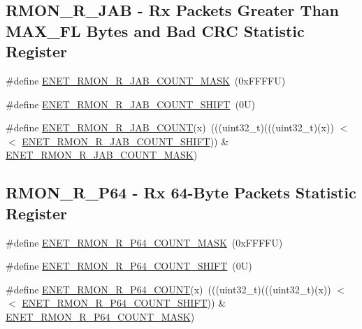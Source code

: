 \subsection*{R\+M\+O\+N\+\_\+\+R\+\_\+\+J\+AB -\/ Rx Packets Greater Than M\+A\+X\+\_\+\+FL Bytes and Bad C\+RC Statistic Register}
\begin{DoxyCompactItemize}
\item 
\#define \mbox{\hyperlink{group___e_n_e_t___register___masks_ga838c0d34688a6347e786a3a66de2fc66}{E\+N\+E\+T\+\_\+\+R\+M\+O\+N\+\_\+\+R\+\_\+\+J\+A\+B\+\_\+\+C\+O\+U\+N\+T\+\_\+\+M\+A\+SK}}~(0x\+F\+F\+F\+F\+U)
\item 
\#define \mbox{\hyperlink{group___e_n_e_t___register___masks_gaec7a433149507aefe611734ae19e7878}{E\+N\+E\+T\+\_\+\+R\+M\+O\+N\+\_\+\+R\+\_\+\+J\+A\+B\+\_\+\+C\+O\+U\+N\+T\+\_\+\+S\+H\+I\+FT}}~(0\+U)
\item 
\#define \mbox{\hyperlink{group___e_n_e_t___register___masks_gaf4a53632e9204c3fa6b812bb2c924976}{E\+N\+E\+T\+\_\+\+R\+M\+O\+N\+\_\+\+R\+\_\+\+J\+A\+B\+\_\+\+C\+O\+U\+NT}}(x)~(((uint32\+\_\+t)(((uint32\+\_\+t)(x)) $<$$<$ \mbox{\hyperlink{group___e_n_e_t___register___masks_gaec7a433149507aefe611734ae19e7878}{E\+N\+E\+T\+\_\+\+R\+M\+O\+N\+\_\+\+R\+\_\+\+J\+A\+B\+\_\+\+C\+O\+U\+N\+T\+\_\+\+S\+H\+I\+FT}})) \& \mbox{\hyperlink{group___e_n_e_t___register___masks_ga838c0d34688a6347e786a3a66de2fc66}{E\+N\+E\+T\+\_\+\+R\+M\+O\+N\+\_\+\+R\+\_\+\+J\+A\+B\+\_\+\+C\+O\+U\+N\+T\+\_\+\+M\+A\+SK}})
\end{DoxyCompactItemize}
\subsection*{R\+M\+O\+N\+\_\+\+R\+\_\+\+P64 -\/ Rx 64-\/\+Byte Packets Statistic Register}
\begin{DoxyCompactItemize}
\item 
\#define \mbox{\hyperlink{group___e_n_e_t___register___masks_ga68d9c25cccce4ef0703577bf06b5bb58}{E\+N\+E\+T\+\_\+\+R\+M\+O\+N\+\_\+\+R\+\_\+\+P64\+\_\+\+C\+O\+U\+N\+T\+\_\+\+M\+A\+SK}}~(0x\+F\+F\+F\+F\+U)
\item 
\#define \mbox{\hyperlink{group___e_n_e_t___register___masks_gaf011d25e6625c11c485b9081f2b9a611}{E\+N\+E\+T\+\_\+\+R\+M\+O\+N\+\_\+\+R\+\_\+\+P64\+\_\+\+C\+O\+U\+N\+T\+\_\+\+S\+H\+I\+FT}}~(0\+U)
\item 
\#define \mbox{\hyperlink{group___e_n_e_t___register___masks_ga8504b7e1afe4a8f7f4d660ce32a0bb60}{E\+N\+E\+T\+\_\+\+R\+M\+O\+N\+\_\+\+R\+\_\+\+P64\+\_\+\+C\+O\+U\+NT}}(x)~(((uint32\+\_\+t)(((uint32\+\_\+t)(x)) $<$$<$ \mbox{\hyperlink{group___e_n_e_t___register___masks_gaf011d25e6625c11c485b9081f2b9a611}{E\+N\+E\+T\+\_\+\+R\+M\+O\+N\+\_\+\+R\+\_\+\+P64\+\_\+\+C\+O\+U\+N\+T\+\_\+\+S\+H\+I\+FT}})) \& \mbox{\hyperlink{group___e_n_e_t___register___masks_ga68d9c25cccce4ef0703577bf06b5bb58}{E\+N\+E\+T\+\_\+\+R\+M\+O\+N\+\_\+\+R\+\_\+\+P64\+\_\+\+C\+O\+U\+N\+T\+\_\+\+M\+A\+SK}})
\end{DoxyCompactItemize}
